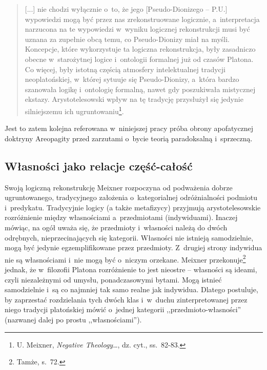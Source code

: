 \begin{quote}
[...] nie chodzi wyłącznie o~to, że jego [Pseudo-Dionizego -- P.U.] wypowiedzi mogą być przez nas zrekonstruowane logicznie, a~interpretacja narzucona na te wypowiedzi w~wyniku logicznej rekonstrukcji musi być uznana za zupełnie obcą temu, co Pseudo-Dionizy miał na myśli. Koncepcje, które wykorzystuje ta logiczna rekonstrukcja, były zasadniczo obecne w~starożytnej logice i~ontologii formalnej już od czasów Platona. Co więcej, były istotną częścią atmosfery intelektualnej tradycji neoplatońskiej, w~której sytuuje się Pseudo-Dionizy, a~która bardzo szanowała logikę i~ontologię formalną, nawet gdy poszukiwała mistycznej ekstazy. Arystotelesowski wpływ na tę tradycję przysłużył się jedynie silniejszemu ich ugruntowaniu\footnote{U. Meixner, \textit{Negative Theology}\ldots, dz. cyt., ss.~82-83.}.
\end{quote}
Jest to zatem kolejna referowana w~niniejszej pracy próba obrony apofatycznej doktryny Areopagity przed zarzutami o~bycie teorią paradoksalną i~sprzeczną.

\subsection{Własności jako relacje część-całość}

Swoją logiczną rekonstrukcję Meixner rozpoczyna od podważenia dobrze ugruntowanego, tradycyjnego założenia o~kategorialnej odróżnialności podmiotu i~predykatu. Tradycyjnie logicy (a także metafizycy) przyjmują arystotelesowskie rozróżnienie między własnościami a~przedmiotami (indywiduami). Inaczej mówiąc, na ogół uważa się, że przedmioty i~własności należą do dwóch odrębnych, nieprzecinających się kategorii. Własności nie istnieją samodzielnie, mogą być jedynie egzemplifikowane przez przedmioty. Z~drugiej strony indywidua nie są własnościami i~nie mogą być o~niczym orzekane. Meixner przekonuje\footnote{Tamże, s.~72.} jednak, że w~filozofii Platona rozróżnienie to jest nieostre -- własności są ideami, czyli niezależnymi od umysłu, ponadczasowymi bytami. Mogą istnieć samodzielnie i~są co najmniej tak samo realne jak indywidua. Dlatego postuluje, by zaprzestać rozdzielania tych dwóch klas i~w~duchu zinterpretowanej przez niego tradycji platońskiej mówić o~jednej kategorii ,,przedmioto-własności'' (nazwanej dalej po prostu ,,własnościami'').

